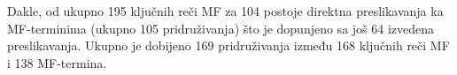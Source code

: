 Dakle, od ukupno 195 ključnih reči MF za 104 postoje direktna preslikavanja ka
MF-terminima (ukupno 105 pridruživanja) što je dopunjeno sa još  64 izvedena
preslikavanja.  Ukupno je dobijeno 169 pridruživanja između 168 ključnih reči
MF i 138 MF-termina.



%
%
%



